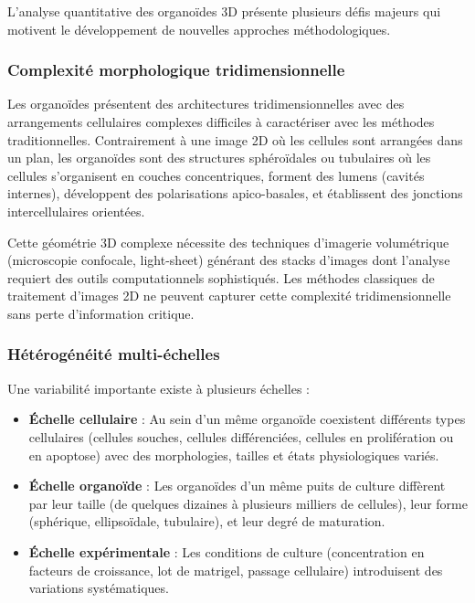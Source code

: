 L'analyse quantitative des organoïdes 3D présente plusieurs défis majeurs qui motivent le développement de nouvelles approches méthodologiques.

\subsubsection{Complexité morphologique tridimensionnelle}

Les organoïdes présentent des architectures tridimensionnelles avec des arrangements cellulaires complexes difficiles à caractériser avec les méthodes traditionnelles. Contrairement à une image 2D où les cellules sont arrangées dans un plan, les organoïdes sont des structures sphéroïdales ou tubulaires où les cellules s'organisent en couches concentriques, forment des lumens (cavités internes), développent des polarisations apico-basales, et établissent des jonctions intercellulaires orientées.

Cette géométrie 3D complexe nécessite des techniques d'imagerie volumétrique (microscopie confocale, light-sheet) générant des stacks d'images dont l'analyse requiert des outils computationnels sophistiqués. Les méthodes classiques de traitement d'images 2D ne peuvent capturer cette complexité tridimensionnelle sans perte d'information critique.

\subsubsection{Hétérogénéité multi-échelles}

Une variabilité importante existe à plusieurs échelles :
\begin{itemize}
    \item \textbf{Échelle cellulaire} : Au sein d'un même organoïde coexistent différents types cellulaires (cellules souches, cellules différenciées, cellules en prolifération ou en apoptose) avec des morphologies, tailles et états physiologiques variés.
    \item \textbf{Échelle organoïde} : Les organoïdes d'un même puits de culture diffèrent par leur taille (de quelques dizaines à plusieurs milliers de cellules), leur forme (sphérique, ellipsoïdale, tubulaire), et leur degré de maturation.
    \item \textbf{Échelle expérimentale} : Les conditions de culture (concentration en facteurs de croissance, lot de matrigel, passage cellulaire) introduisent des variations systématiques.
\end{itemize}

